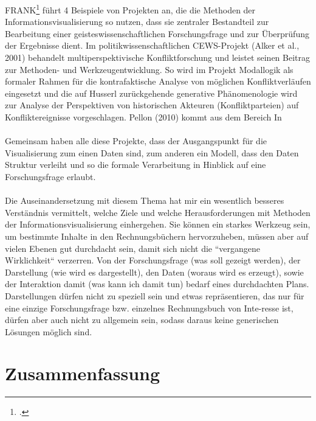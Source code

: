 \documentclass[12pt,a4paper]{article}
\begin{document}
FRANK\footcite{frank2018visualisierungswerkzeuge} führt 4 Beispiele von Projekten an, die die Methoden der Informationsvisualisierung so nutzen, dass sie zentraler Bestandteil zur Bearbeitung einer geisteswissenschaftlichen Forschungsfrage  und zur Überprüfung der Ergebnisse dient. Im politikwissenschaftlichen CEWS-Projekt (Alker et al., 2001) behandelt multiperspektivische Konfliktforschung und leistet seinen Beitrag zur Methoden- und Werkzeugentwicklung. So wird im Projekt Modallogik als formaler Rahmen für die kontrafaktische Analyse von möglichen Konfliktverläufen eingesetzt und die auf Husserl zurückgehende generative Phänomenologie wird zur Analyse der Perspektiven von historischen Akteuren (Konfliktparteien) auf Konfliktereignisse vorgeschlagen. Pellon (2010) kommt aus dem Bereich In
\\
\\
Gemeinsam haben alle diese Projekte, dass der Ausgangspunkt für die Visualisierung zum einen Daten sind, zum anderen ein Modell, dass den Daten Struktur verleiht und so die formale Verarbeitung in Hinblick auf eine Forschungsfrage erlaubt.
\\
\\
Die Auseinandersetzung mit diesem Thema hat mir ein wesentlich besseres Verständnis vermittelt, welche Ziele und welche Herausforderungen mit Methoden der Informationsvisualisierung einhergehen. Sie können ein starkes Werkzeug sein, um bestimmte Inhalte in den Rechnungsbüchern hervorzuheben, müssen aber auf vielen Ebenen gut durchdacht sein, damit sich nicht die “vergangene Wirklichkeit“ verzerren. Von der Forschungsfrage (was soll gezeigt werden), der Darstellung (wie wird es dargestellt), den Daten (woraus wird es erzeugt), sowie der Interaktion damit (was kann ich damit tun) bedarf eines durchdachten Plans. Darstellungen dürfen nicht zu speziell sein und etwas repräsentieren, das nur für eine einzige Forschungsfrage bzw. einzelnes Rechnungsbuch von Inte-resse ist, dürfen aber auch nicht zu allgemein sein, sodass daraus keine generischen Lösungen möglich sind.


\newpage
\section{Zusammenfassung}

\newpage


\newpage
\listoffigures
\end{document}
